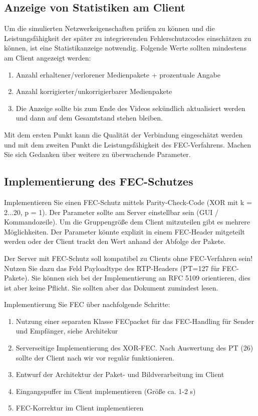 \subsection{Anzeige von Statistiken am Client}

Um die simulierten Netzwerkeigenschaften prüfen zu können und die Leistungsfähigkeit der später zu integrierenden Fehlerschutzcodes einschätzen zu können, ist eine Statistikanzeige notwendig. Folgende Werte sollten mindestens am Client angezeigt werden:
\begin{enumerate}
	\item Anzahl erhaltener/verlorener Medienpakete + prozentuale Angabe
	\item Anzahl korrigierter/unkorrigierbarer Medienpakete
	\item Die Anzeige sollte bis zum Ende des Videos sekündlich aktualisiert werden und dann auf dem Gesamtstand stehen bleiben.
\end{enumerate}

Mit dem ersten Punkt kann die Qualität der Verbindung eingeschätzt werden und mit dem zweiten Punkt die Leistungsfähigkeit des FEC-Verfahrens. Machen Sie sich Gedanken über weitere zu überwachende Parameter.
\subsection{Implementierung des FEC-Schutzes}
Implementieren Sie einen FEC-Schutz mittels Parity-Check-Code (XOR mit k = 2...20, p = 1). Der Parameter sollte am Server einstellbar sein (GUI / Kommandozeile). Um die Gruppengröße dem Client mitzuteilen gibt es mehrere Möglichkeiten. Der Parameter könnte explizit in einem FEC-Header mitgeteilt werden oder der Client trackt den Wert anhand der Abfolge der Pakete.

Der Server mit FEC-Schutz soll kompatibel zu Clients ohne FEC-Verfahren sein! Nutzen Sie dazu das Feld Payloadtype des RTP-Headers (PT=127 für FEC-Pakete). Sie können sich bei der Implementierung an RFC 5109 orientieren, dies ist aber keine Pflicht. Sie sollten aber das Dokument zumindest lesen.

Implementierung Sie FEC über nachfolgende Schritte:
\begin{enumerate}
	\item Nutzung einer separaten Klasse FECpacket für das FEC-Handling für Sender und Empfänger, siehe Architekur	
	\item Serverseitige Implementierung des XOR-FEC. Nach Auswertung des PT (26) sollte der Client nach wir vor regulär funktionieren.
	\item Entwurf der Architektur der Paket- und Bildverarbeitung im Client
	\item Eingangspuffer im Client implementieren (Größe ca. 1-2 s)
	\item FEC-Korrektur im Client implementieren
\end{enumerate}

